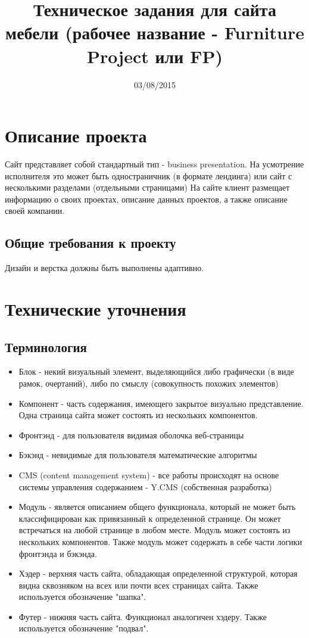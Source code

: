 \documentclass[DIV=calc, paper=a4, fontsize=11pt]{scrartcl} %
\title{Техническое задания для сайта мебели (рабочее название - Furniture Project или FP)}
\date{03/08/2015}
\begin{document}
\maketitle

\section{Описание проекта}

Сайт представляет собой стандартный тип - business presentation. На усмотрение исполнителя это может быть одностраничник (в формате лендинга) или сайт с несколькими разделами (отдельными страницами)
На сайте клиент размещает информацию о своих проектах, описание данных проектов, а также описание своей компании.

\subsection{Общие требования к проекту}
Дизайн и верстка должны быть выполнены адаптивно.

\section{Технические уточнения}

\subsection{Терминология}
        
        \begin{itemize}
        \item Блок - некий визуальный элемент, выделяющийся либо графически (в виде рамок, очертаний), либо по смыслу (совокупность похожих элементов)
        \item Компонент - часть содержания, имеющего закрытое визуально представление. Одна страница сайта может состоять из нескольких компонентов.
        \item Фронтэнд - для пользователя видимая оболочка веб-страницы
        \item Бэкэнд - невидимые для пользователя математические алгоритмы
        \item CMS (content management system) - все работы происходят на основе системы управления содержанием - Y.CMS (собственная разработка)
        \item Модуль - является описанием общего функционала, который не может быть классифицирован как привязанный к определенной странице. Он может встречаться на любой странице в любом месте. Модуль может состоять из нескольких компонентов. Также модуль может содержать в себе части логики фронтэнда и бэкэнда.
        \item Хэдер - верхняя часть сайта, обладающая определенной структурой, которая видна сквозняком на всех или почти всех страницах сайта. Также используется обозначение "шапка".
        \item Футер - нижняя часть сайта. Функционал аналогичен хэдеру. Также используется обозначение "подвал".
    \end{itemize}
    
\end{document}
